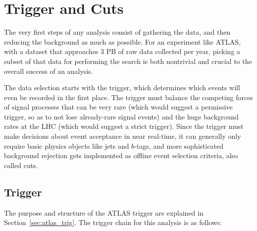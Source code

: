  

\chapter[Trigger and Cuts]{Trigger and Cuts}

The very first steps of any analysis consist of gathering the data, and then reducing the background
as much as possible.  For an experiment like ATLAS, with a dataset that approaches 3 PB of raw
data collected per year, picking a subset of that data for performing the search is both nontrivial
and crucial to the overall success of an analysis.  

The data selection starts with the trigger, which determines which events will even be recorded in the
first place.  The trigger must balance the competing forces of signal processes that can be very rare
(which would suggest a permissive trigger, so as to not lose already-rare signal events) and the
huge background rates at the LHC (which would suggest a strict trigger).  Since the trigger must make
decisions about event acceptance in near real-time, it can generally only require basic physics objects
like jets and $b$-tags, and more sophisticated background rejection gets implemented as offline event 
selection criteria, also called cuts.  

 
\section{Trigger}
\label{sec:my_trigger}
The purpose and structure of the ATLAS trigger are explained in Section~\ref{sec:atlas_trig}.
  The trigger chain for this analysis is as follows: 

